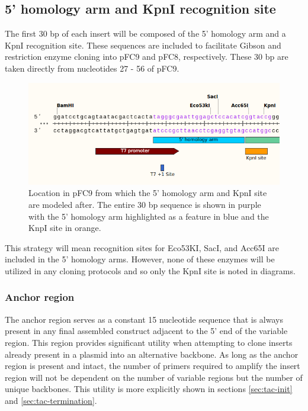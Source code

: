 \documentclass[11pt]{article}
\begin{document}
\subsection{5' homology arm and KpnI recognition site}

The first 30 bp of each insert will be composed of the 5' homology arm and a KpnI recognition site. These sequences are included to facilitate Gibson and restriction enzyme cloning into pFC9 and pFC8, respectively. These 30 bp are taken directly from nucleotides 27 - 56 of pFC9.

\begin{figure}[h]
	\includegraphics[width=12cm]{images/variable_region/5_homology_arm.png}
	\centering
	\caption{Location in pFC9 from which the 5' homology arm and KpnI site are modeled after. The entire 30 bp sequence is shown in purple with the 5' homology arm highlighted as a feature in blue and the KnpI site in orange.}
	\label{fig:homology_5}
\end{figure}

This strategy will mean recognition sites for Eco53KI, SacI, and Acc65I are included in the 5' homology arms. However, none of these enzymes will be utilized in any cloning protocols and so only the KpnI site is noted in diagrams.


\subsubsection{Anchor region}

The anchor region serves as a constant 15 nucleotide sequence that is always present in any final assembled construct adjacent to the 5' end of the variable region. This region provides significant utility when attempting to clone inserts already present in a plasmid into an alternative backbone. As long as the anchor region is present and intact, the number of primers required to amplify the insert region will not be dependent on the number of variable regions but the number of unique backbones. This utility is more explicitly shown in sections \ref{sec:tac-init} and \ref{sec:tac-termination}. 
\end{document}
